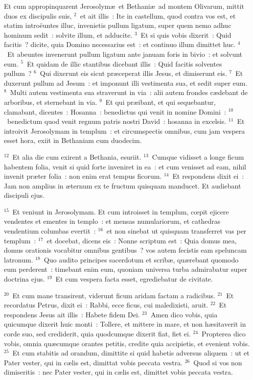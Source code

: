 \lettrine[lines=3,image=true,loversize=0.05,lraise=-0.03]{E}{}t cum appropinquarent Jerosolym\ae\ et Bethani\ae\ ad montem Olivarum, mittit duos ex discipulis suis,
${}^{2}$~et ait illis~: Ite in castellum, quod contra vos est, et statim intro\"euntes illuc, invenietis pullum ligatum, super quem nemo adhuc hominum sedit~: solvite illum, et adducite.
${}^{3}$~Et si quis vobis dixerit~: Quid facitis~? dicite, quia Domino necessarius est~: et continuo illum dimittet huc.
${}^{4}$~Et abeuntes invenerunt pullum ligatum ante januam foris in bivio~: et solvunt eum.
${}^{5}$~Et quidam de illic stantibus dicebant illis~: Quid facitis solventes pullum~?
${}^{6}$~Qui dixerunt eis sicut pr\ae ceperat illis Jesus, et dimiserunt eis.
${}^{7}$~Et duxerunt pullum ad Jesum~: et imponunt illi vestimenta sua, et sedit super eum.
${}^{8}$~Multi autem vestimenta sua straverunt in via~: alii autem frondes c\ae debant de arboribus, et sternebant in via.
${}^{9}$~Et qui pr\ae ibant, et qui sequebantur, clamabant, dicentes~: Hosanna~: benedictus qui venit in nomine Domini~:
${}^{10}$~benedictum quod venit regnum patris nostri David~: hosanna in excelsis.
${}^{11}$~Et introivit Jerosolymam in templum~: et circumspectis omnibus, cum jam vespera esset hora, exiit in Bethaniam cum duodecim.


${}^{12}$~Et alia die cum exirent a Bethania, esuriit.
${}^{13}$~Cumque vidisset a longe ficum habentem folia, venit si quid forte inveniret in ea~: et cum venisset ad eam, nihil invenit pr\ae ter folia~: non enim erat tempus ficorum.
${}^{14}$~Et respondens dixit ei~: Jam non amplius in \ae ternum ex te fructum quisquam manducet. Et audiebant discipuli ejus.


${}^{15}$~Et veniunt in Jerosolymam. Et cum introisset in templum, cœpit ejicere vendentes et ementes in templo~: et mensas numulariorum, et cathedras vendentium columbas evertit~:
${}^{16}$~et non sinebat ut quisquam transferret vas per templum~:
${}^{17}$~et docebat, dicens eis~: Nonne scriptum est~: Quia domus mea, domus orationis vocabitur omnibus gentibus~? vos autem fecistis eam speluncam latronum.
${}^{18}$~Quo audito principes sacerdotum et scrib\ae , qu\ae rebant quomodo eum perderent~: timebant enim eum, quoniam universa turba admirabatur super doctrina ejus.
${}^{19}$~Et cum vespera facta esset, egrediebatur de civitate.


${}^{20}$~Et cum mane transirent, viderunt ficum aridam factam a radicibus.
${}^{21}$~Et recordatus Petrus, dixit ei~: Rabbi, ecce ficus, cui maledixisti, aruit.
${}^{22}$~Et respondens Jesus ait illis~: Habete fidem Dei.
${}^{23}$~Amen dico vobis, quia quicumque dixerit huic monti~: Tollere, et mittere in mare, et non h\ae sitaverit in corde suo, sed crediderit, quia quodcumque dixerit fiat, fiet ei.
${}^{24}$~Propterea dico vobis, omnia qu\ae cumque orantes petitis, credite quia accipietis, et evenient vobis.
${}^{25}$~Et cum stabitis ad orandum, dimittite si quid habetis adversus aliquem~: ut et Pater vester, qui in c\ae lis est, dimittat vobis peccata vestra.
${}^{26}$~Quod si vos non dimiseritis~: nec Pater vester, qui in c\ae lis est, dimittet vobis peccata vestra.


